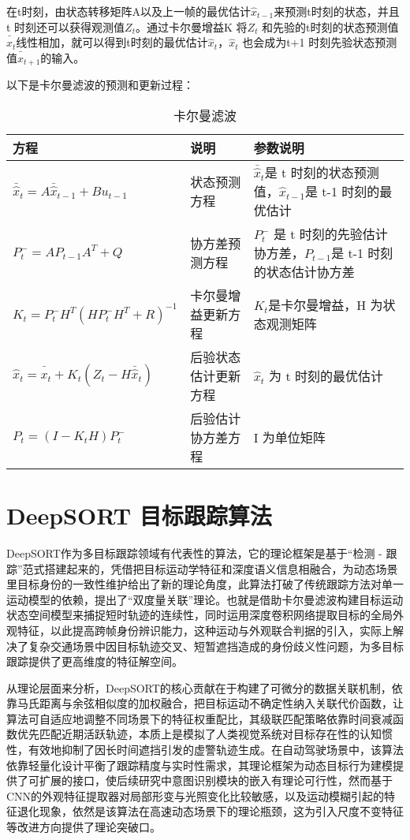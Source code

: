 在t时刻，由状态转移矩阵A以及上一帧的最优估计\(\hat{x}_{t - 1}\)来预测t时刻的状态，并且t 时刻还可以获得观测值\(Z_t\)。通过卡尔曼增益K 将\(Z_t\) 和先验的t时刻的状态预测值\(\bar{\hat{x}}_t\)线性相加，就可以得到t时刻的最优估计\(\hat{x}_t\)，\(\hat{x}_t\) 也会成为t+1 时刻先验状态预测值\(\bar{\hat{x}}_{t + 1}\)的输入。

以下是卡尔曼滤波的预测和更新过程：

\begin{table}[htbp]
	\caption{卡尔曼滤波}
	\label{tab:software_stack}
	\centering
	\begin{tabular}{l p{5cm} p{5cm}} %
		\toprule
		方程 & 说明 & 参数说明 \\
		\midrule
		\(\bar{\hat{x}}_t = A\bar{\hat{x}}_{t - 1} + Bu_{t - 1}\)   & 状态预测方程 & \(\bar{\hat{x}}_t\)是 t 时刻的状态预测值，\(\hat{x}_{t - 1}\)是 t-1 时刻的最优估计 \\
		\(P_t^- = AP_{t - 1}A^T + Q\)  & 协方差预测方程 & \(P_t^-\) 是 t 时刻的先验估计协方差，\(P_{t - 1}\)是 t-1 时刻的状态估计协方差 \\
		\(K_t = P_t^-H^T(HP_t^-H^T + R)^{-1}\)  & 卡尔曼增益更新方程 & \(K_t\)是卡尔曼增益，H 为状态观测矩阵 \\
		\(\hat{x}_t = \bar{\hat{x}}_t + K_t(Z_t - H\bar{\hat{x}}_t)\)   & 后验状态估计更新方程 & \(\hat{x}_t\) 为 t 时刻的最优估计 \\
		\(P_t = (I - K_tH)P_t^-\)  & 后验估计协方差方程 & I 为单位矩阵 \\
		\bottomrule
	\end{tabular}
\end{table}

\section{DeepSORT 目标跟踪算法}

DeepSORT作为多目标跟踪领域有代表性的算法，它的理论框架是基于“检测 - 跟踪”范式搭建起来的，凭借把目标运动学特征和深度语义信息相融合，为动态场景里目标身份的一致性维护给出了新的理论角度，此算法打破了传统跟踪方法对单一运动模型的依赖，提出了“双度量关联”理论。也就是借助卡尔曼滤波构建目标运动状态空间模型来捕捉短时轨迹的连续性，同时运用深度卷积网络提取目标的全局外观特征，以此提高跨帧身份辨识能力，这种运动与外观联合判据的引入，实际上解决了复杂交通场景中因目标轨迹交叉、短暂遮挡造成的身份歧义性问题，为多目标跟踪提供了更高维度的特征解空间。 

从理论层面来分析，DeepSORT的核心贡献在于构建了可微分的数据关联机制，依靠马氏距离与余弦相似度的加权融合，把目标运动不确定性纳入关联代价函数，让算法可自适应地调整不同场景下的特征权重配比，其级联匹配策略依靠时间衰减函数优先匹配近期活跃轨迹，本质上是模拟了人类视觉系统对目标存在性的认知惯性，有效地抑制了因长时间遮挡引发的虚警轨迹生成。在自动驾驶场景中，该算法依靠轻量化设计平衡了跟踪精度与实时性需求，其理论框架为动态目标行为建模提供了可扩展的接口，使后续研究中意图识别模块的嵌入有理论可行性，然而基于CNN的外观特征提取器对局部形变与光照变化比较敏感，以及运动模糊引起的特征退化现象，依然是该算法在高速动态场景下的理论瓶颈，这为引入尺度不变特征等改进方向提供了理论突破口。

